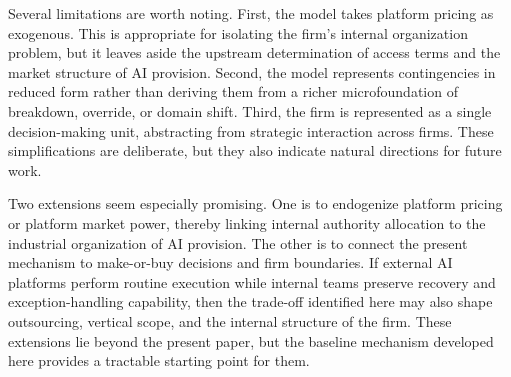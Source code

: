 Several limitations are worth noting. First, the model takes platform pricing as exogenous. This is appropriate for isolating the firm's internal organization problem, but it leaves aside the upstream determination of access terms and the market structure of AI provision. Second, the model represents contingencies in reduced form rather than deriving them from a richer microfoundation of breakdown, override, or domain shift. Third, the firm is represented as a single decision-making unit, abstracting from strategic interaction across firms. These simplifications are deliberate, but they also indicate natural directions for future work.

Two extensions seem especially promising. One is to endogenize platform pricing or platform market power, thereby linking internal authority allocation to the industrial organization of AI provision. The other is to connect the present mechanism to make-or-buy decisions and firm boundaries. If external AI platforms perform routine execution while internal teams preserve recovery and exception-handling capability, then the trade-off identified here may also shape outsourcing, vertical scope, and the internal structure of the firm. These extensions lie beyond the present paper, but the baseline mechanism developed here provides a tractable starting point for them.
